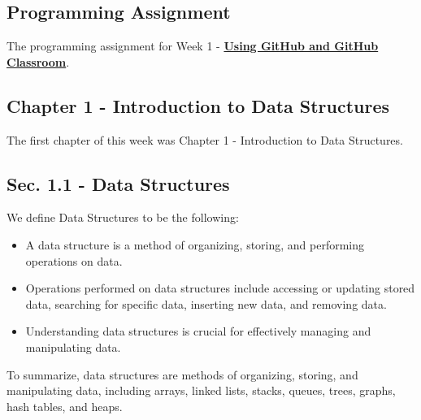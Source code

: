 \subsection{Programming Assignment}

The programming assignment for Week 1 - \href{https://github.com/cu-cspb-2270-Summer-2023/pa0-RelativiBit}{\textbf{Using GitHub and GitHub Classroom}}.

\subsection{Chapter 1 - Introduction to Data Structures}

The first chapter of this week was Chapter 1 - Introduction to Data Structures.

\subsection*{Sec. 1.1 - Data Structures}
We define Data Structures to be the following:
\begin{itemize}
    \item A data structure is a method of organizing, storing, and performing operations on data.
    \item Operations performed on data structures include accessing or updating stored data, searching for specific data, inserting new data, and removing data.
    \item Understanding data structures is crucial for effectively managing and manipulating data.
\end{itemize}
To summarize, data structures are methods of organizing, storing, and manipulating data, including arrays, linked lists, stacks, queues, trees, graphs, hash tables,
and heaps.

